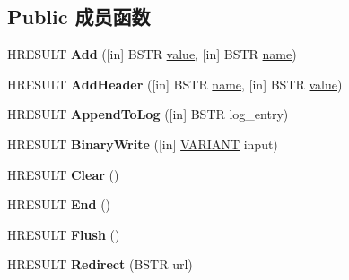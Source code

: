 \subsection*{Public 成员函数}
\begin{DoxyCompactItemize}
\item 
\mbox{\label{interface_i_response_a095a2d4456be532d24e22ab4fa035067}} 
H\+R\+E\+S\+U\+LT {\bfseries Add} (\mbox{[}in\mbox{]} B\+S\+TR \hyperlink{unionvalue}{value}, \mbox{[}in\mbox{]} B\+S\+TR \hyperlink{structname}{name})
\item 
\mbox{\label{interface_i_response_af968acc397d1f6505654ad5535bf379b}} 
H\+R\+E\+S\+U\+LT {\bfseries Add\+Header} (\mbox{[}in\mbox{]} B\+S\+TR \hyperlink{structname}{name}, \mbox{[}in\mbox{]} B\+S\+TR \hyperlink{unionvalue}{value})
\item 
\mbox{\label{interface_i_response_ac34f3aeb7b1ead1e54bfa586aba01e74}} 
H\+R\+E\+S\+U\+LT {\bfseries Append\+To\+Log} (\mbox{[}in\mbox{]} B\+S\+TR log\+\_\+entry)
\item 
\mbox{\label{interface_i_response_a4b1678a6fe1dbbe38c4ba223dec3e04e}} 
H\+R\+E\+S\+U\+LT {\bfseries Binary\+Write} (\mbox{[}in\mbox{]} \hyperlink{structtag_v_a_r_i_a_n_t}{V\+A\+R\+I\+A\+NT} input)
\item 
\mbox{\label{interface_i_response_ad420e6a6df65958005d9b96831ffdb25}} 
H\+R\+E\+S\+U\+LT {\bfseries Clear} ()
\item 
\mbox{\label{interface_i_response_ac9fd3eb5e64091c31244935877e19d2a}} 
H\+R\+E\+S\+U\+LT {\bfseries End} ()
\item 
\mbox{\label{interface_i_response_af7c85eb7f7b7a35e9d611da11cc24373}} 
H\+R\+E\+S\+U\+LT {\bfseries Flush} ()
\item 
\mbox{\label{interface_i_response_a2781a497f409274b30397a912cacede6}} 
H\+R\+E\+S\+U\+LT {\bfseries Redirect} (B\+S\+TR url)
\item 
\mbox{\label{interface_i_response_a17eacfbe80f0ca6ee3de2e795ad7ac3f}} 

\end{DoxyCompactItemize}
